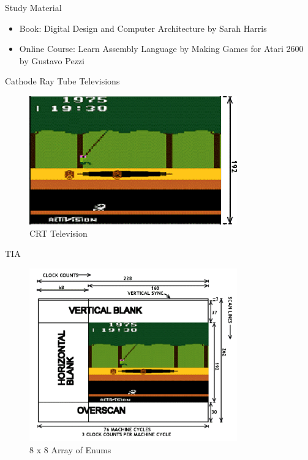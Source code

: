 \documentclass{beamer}
\begin{document}
\begin{frame}{Study Material}
  \begin{itemize}
    \item Book: Digital Design and Computer Architecture by Sarah Harris
    \item Online Course: Learn Assembly Language by Making Games for Atari 2600 by Gustavo Pezzi
  \end{itemize}

\end{frame}



\begin{frame}{Cathode Ray Tube Televisions}
    \begin{figure}
        \centering
        \includegraphics[width=0.8\textwidth]{monitor.png} %

        \caption{CRT Television}
    \end{figure}
\end{frame}


\begin{frame}{TIA}
    \begin{figure}
        \centering
        \includegraphics[width=0.8\textwidth]{screen_whole.png} %

        \caption{8 x 8 Array of Enums}
    \end{figure}
\end{frame}
\end{document}
